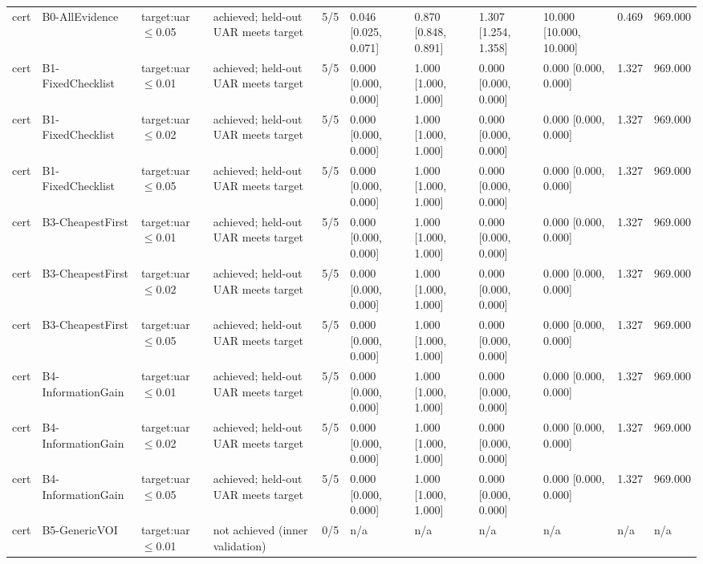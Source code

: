 \begin{table}[!ht]
{\begin{tabular}{lllllllllll}
cert & B0-AllEvidence & target:uar$\le$0.05 & achieved; held-out UAR meets target & 5/5 & 0.046 [0.025, 0.071] & 0.870 [0.848, 0.891] & 1.307 [1.254, 1.358] & 10.000 [10.000, 10.000] & 0.469 & 969.000 \\
cert & B1-FixedChecklist & target:uar$\le$0.01 & achieved; held-out UAR meets target & 5/5 & 0.000 [0.000, 0.000] & 1.000 [1.000, 1.000] & 0.000 [0.000, 0.000] & 0.000 [0.000, 0.000] & 1.327 & 969.000 \\
cert & B1-FixedChecklist & target:uar$\le$0.02 & achieved; held-out UAR meets target & 5/5 & 0.000 [0.000, 0.000] & 1.000 [1.000, 1.000] & 0.000 [0.000, 0.000] & 0.000 [0.000, 0.000] & 1.327 & 969.000 \\
cert & B1-FixedChecklist & target:uar$\le$0.05 & achieved; held-out UAR meets target & 5/5 & 0.000 [0.000, 0.000] & 1.000 [1.000, 1.000] & 0.000 [0.000, 0.000] & 0.000 [0.000, 0.000] & 1.327 & 969.000 \\
cert & B3-CheapestFirst & target:uar$\le$0.01 & achieved; held-out UAR meets target & 5/5 & 0.000 [0.000, 0.000] & 1.000 [1.000, 1.000] & 0.000 [0.000, 0.000] & 0.000 [0.000, 0.000] & 1.327 & 969.000 \\
cert & B3-CheapestFirst & target:uar$\le$0.02 & achieved; held-out UAR meets target & 5/5 & 0.000 [0.000, 0.000] & 1.000 [1.000, 1.000] & 0.000 [0.000, 0.000] & 0.000 [0.000, 0.000] & 1.327 & 969.000 \\
cert & B3-CheapestFirst & target:uar$\le$0.05 & achieved; held-out UAR meets target & 5/5 & 0.000 [0.000, 0.000] & 1.000 [1.000, 1.000] & 0.000 [0.000, 0.000] & 0.000 [0.000, 0.000] & 1.327 & 969.000 \\
cert & B4-InformationGain & target:uar$\le$0.01 & achieved; held-out UAR meets target & 5/5 & 0.000 [0.000, 0.000] & 1.000 [1.000, 1.000] & 0.000 [0.000, 0.000] & 0.000 [0.000, 0.000] & 1.327 & 969.000 \\
cert & B4-InformationGain & target:uar$\le$0.02 & achieved; held-out UAR meets target & 5/5 & 0.000 [0.000, 0.000] & 1.000 [1.000, 1.000] & 0.000 [0.000, 0.000] & 0.000 [0.000, 0.000] & 1.327 & 969.000 \\
cert & B4-InformationGain & target:uar$\le$0.05 & achieved; held-out UAR meets target & 5/5 & 0.000 [0.000, 0.000] & 1.000 [1.000, 1.000] & 0.000 [0.000, 0.000] & 0.000 [0.000, 0.000] & 1.327 & 969.000 \\
cert & B5-GenericVOI & target:uar$\le$0.01 & not achieved (inner validation) & 0/5 & n/a & n/a & n/a & n/a & n/a & n/a \\

\end{tabular}}
\end{table}
